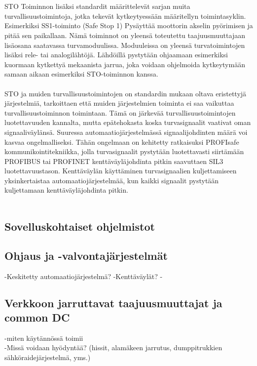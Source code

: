 \documentclass[finnish,12pt,a4paper,pdftex,elec,utf8]{aaltothesis}
\begin{document}
\\\\
STO Toiminnon lisäksi standardit määrittelevät sarjan muita turvallisuustoimintoja, jotka tekevät kytkeytyessään määritellyn toimintasyklin. Esimerkiksi SS1-toiminto (Safe Stop 1) Pysäyttää moottorin akselin pyörimisen ja pitää sen paikallaan. Nämä toiminnot on yleensä toteutettu taajuusmuuttajaan lisäosana saatavassa turvamoduulissa. Moduuleissa on yleensä turvatoimintojen lisäksi rele- tai analogilähtöjä. Lähdöillä pystytään ohjaamaan esimerkiksi kuormaan kytkettyä mekaanista jarrua, joka voidaan ohjelmoida kytkeytymään samaan aikaan esimerkiksi STO-toiminnon kanssa.
\\\\
STO ja muiden turvallisuustoimintojen on standardin mukaan oltava eristettyjä järjestelmiä, tarkoittaen että muiden järjestelmien toiminta ei saa vaikuttaa turvallisuustoiminnon toimintaan. Tämä on järkevää turvallisuustoimintojen luotettavuuden kannalta, mutta epätehokasta koska turvasignaalit vaativat oman signaaliväylänsä. Suuressa automaatiojärjestelmässä signaalijohdinten määrä voi kasvaa ongelmalliseksi. Tähän ongelmaan on kehitetty ratkaisuksi PROFIsafe kommunikointitekniikka, jolla turvasignaalit pystytään luotettavasti siirtämään PROFIBUS tai PROFINET kenttäväyläjohdinta pitkin saavuttaen SIL3 luotettavuustason. Kenttäväylän käyttäminen turvasignaalien kuljettamiseen yksinkertaistaa automaatiojärjestelmää, kun kaikki signaalit pystytään kuljettamaan kenttäväyläjohdinta pitkin.
\\\\




\subsection{Sovelluskohtaiset ohjelmistot}


\subsection{Ohjaus ja -valvontajärjestelmät}
-Keskitetty automaatiojärjestelmä?
-Kenttäväylät?
-
\subsection{Verkkoon jarruttavat taajuusmuuttajat ja common DC}
-miten käytännössä toimii\\
-Missä voidaan hyödyntää? (hissit, alamäkeen jarrutus, dumppitrukkien sähköraidejärjestelmä, yms.)
\end{document}
